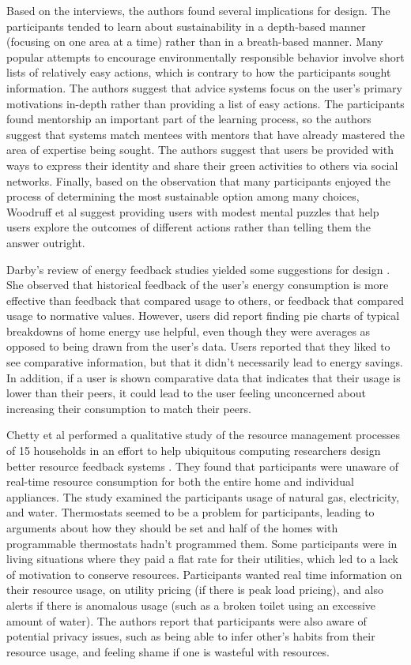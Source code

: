 Based on the interviews, the authors found several implications for design. The participants tended to learn about sustainability in a depth-based manner (focusing on one area at a time) rather than in a breath-based manner. Many popular attempts to encourage environmentally responsible behavior involve short lists of relatively easy actions, which is contrary to how the participants sought information. The authors suggest that advice systems focus on the user's primary motivations in-depth rather than providing a list of easy actions. The participants found mentorship an important part of the learning process, so the authors suggest that systems match mentees with mentors that have already mastered the area of expertise being sought. The authors suggest that users be provided with ways to express their identity and share their green activities to others via social networks. Finally, based on the observation that many participants enjoyed the process of determining the most sustainable option among many choices, Woodruff et al suggest providing users with modest mental puzzles that help users explore the outcomes of different actions rather than telling them the answer outright.

Darby's review of energy feedback studies yielded some suggestions for design \cite{darby-review-2006}. She observed that historical feedback of the user's energy consumption is more effective than feedback that compared usage to others, or feedback that compared usage to normative values. However, users did report finding pie charts of typical breakdowns of home energy use helpful, even though they were averages as opposed to being drawn from the user's data. Users reported that they liked to see comparative information, but that it didn't necessarily lead to energy savings. In addition, if a user is shown comparative data that indicates that their usage is lower than their peers, it could lead to the user feeling unconcerned about increasing their consumption to match their peers.

Chetty et al performed a qualitative study of the resource management processes of 15 households in an effort to help ubiquitous computing researchers design better resource feedback systems \cite{chetty-2008}. They found that participants were unaware of real-time resource consumption for both the entire home and individual appliances. The study examined the participants usage of natural gas, electricity, and water. Thermostats seemed to be a problem for participants, leading to arguments about how they should be set and half of the homes with programmable thermostats hadn't programmed them. Some participants were in living situations where they paid a flat rate for their utilities, which led to a lack of motivation to conserve resources. Participants wanted real time information on their resource usage, on utility pricing (if there is peak load pricing), and also alerts if there is anomalous usage (such as a broken toilet using an excessive amount of water). The authors report that participants were also aware of potential privacy issues, such as being able to infer other's habits from their resource usage, and feeling shame if one is wasteful with resources.

